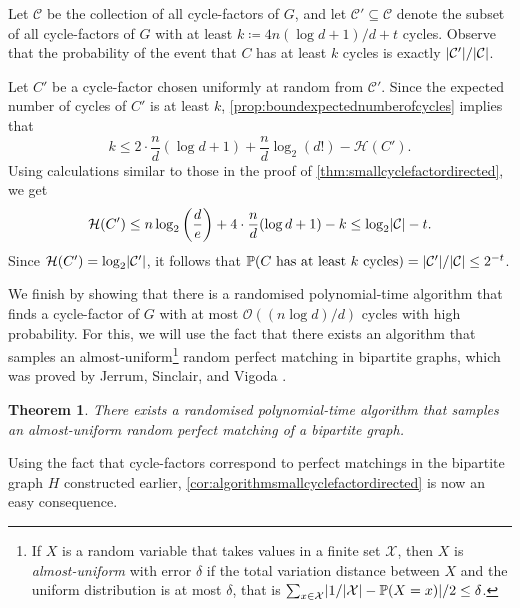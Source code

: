 \documentclass[11pt]{article}
\makeatletter
\theoremstyle{plain}
\newtheorem{theorem}{Theorem}[section]
\theoremstyle{definition}
\renewenvironment{proof}[1][\proofname]
{\par\pushQED{\qed}
	\normalfont\topsep6\p@\@plus6\p@\relax\trivlist
	\item[\hskip\labelsep\bfseries#1\@addpunct{.}]
	\ignorespaces}
{\popQED\endtrivlist\@endpefalse}
\newcommand{\pr}{\mathbb{P}}
\newcommand{\ent}{\mathcal{H}}
\newcommand{\cO}{\mathcal O}
\newcommand{\C}{\mathcal C}
\newcommand{\X}{\mathcal X}
\newcommand{\logt}{\log_2}
\DeclarePairedDelimiter{\abs}{\lvert}{\rvert}
\makeatother
\begin{document}
\begin{proof}[Proof of \cref{thm:numbercyclesconcentration}]
    Let $\C$ be the collection of all cycle-factors of $G$, and let $\C' \subseteq \C$ denote the subset of all cycle-factors of $G$ with at least $k \coloneqq 4 n (\log d + 1) / d + t$ cycles. Observe that the probability of the event that $C$ has at least $k$ cycles is exactly $\abs{\C'}/\abs{\C}$.
    
    Let $C'$ be a cycle-factor chosen uniformly at random from $\C'$. Since the expected number of cycles of $C'$ is at least $k$, \cref{prop:boundexpectednumberofcycles} implies that
    \[
        k \le 2 \cdot \frac{n}{d} (\log d + 1) + \frac{n}{d} \logt(d!) - \ent(C').
    \]
    Using calculations similar to those in the proof of \cref{thm:smallcyclefactordirected}, we get
    \[
        \ent(C') \le n \logt\left(\frac{d}{e}\right) + 4 \cdot \frac{n}{d} (\log d + 1) - k \le \logt \abs{\C} - t.
    \]
    Since $\ent(C') = \logt \abs{\C'}$, it follows that $\pr(C \text{ has at least } k \text{ cycles}) = \abs{\C'}/\abs{\C} \le 2^{-t}$.
\end{proof}

We finish by showing that there is a randomised polynomial-time algorithm that finds a cycle-factor of $G$ with at most $\cO((n\log d)/d)$ cycles with high probability. For this, we will use the fact that there exists an algorithm that samples an almost-uniform\footnote{If $X$ is a random variable that takes values in a finite set $\X$, then $X$ is \emph{almost-uniform} with error $\delta$ if the total variation distance between $X$ and the uniform distribution is at most $\delta$, that is $\sum_{x \in \X} \abs{1/\abs{\X} - \pr(X = x)}/2 \le \delta$.} random perfect matching in bipartite graphs, which was proved by Jerrum, Sinclair, and Vigoda \cite{jerrum2004polynomial}.

\begin{theorem}\label{thm:algorithmalmostuniformperfectmatching}
    There exists a randomised polynomial-time algorithm that samples an almost-uniform random perfect matching of a bipartite graph.
\end{theorem}

Using the fact that cycle-factors correspond to perfect matchings in the bipartite graph $H$ constructed earlier, \cref{cor:algorithmsmallcyclefactordirected} is now an easy consequence.
\end{document}
